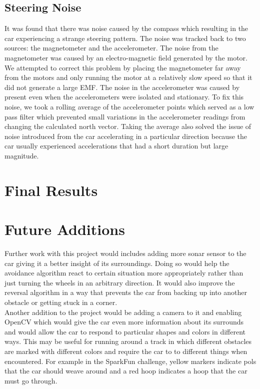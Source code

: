 \documentclass[final,letterpaper,singleside,12pt]{article}
\begin{document}
\subsection{Steering Noise} %
\label{sub:steering_noise}
It was found that there was noise caused by the compass which resulting in the car experiencing a strange steering pattern. The noise was tracked back to two sources: the magnetometer and the accelerometer. The noise from the magnetometer was caused by an electro-magnetic field generated by the motor. We attempted to correct this problem by placing the magnetometer far away from the motors and only running the motor at a relatively slow speed so that it did not generate a large EMF. The noise in the accelerometer was caused by present even when the accelerometers were isolated and stationary. To fix this noise, we took a rolling average of the accelerometer points which served as a low pass filter which prevented small variations in the accelerometer readings from changing the calculated north vector. Taking the average also solved the issue of noise introduced from the car accelerating in a particular direction because the car usually experienced accelerations that had a short duration but large magnitude.

\pagebreak

\section{Final Results} %
\label{sec:final_results}

\pagebreak
\section{Future Additions} %
\label{sec:future}
Further work with this project would includes adding more sonar sensor to the car giving it a better insight of its surroundings. Doing so would help the avoidance algorithm react to certain situation more appropriately rather than just turning the wheels in an arbitrary direction. It would also improve the reversal algorithm in a way that prevents the car from backing up into another obstacle or getting stuck in a corner.\\
Another addition to the project would be adding a camera to it and enabling OpenCV which would give the car even more information about its surrounds and would allow the car to respond to particular shapes and colors in different ways. This may be useful for running around a track in which different obstacles are marked with different colors and require the car to to different things when encountered. For example in the SparkFun challenge, yellow markers indicate pols that the car should weave around and a red hoop indicates a hoop that the car must go through.
\end{document}
